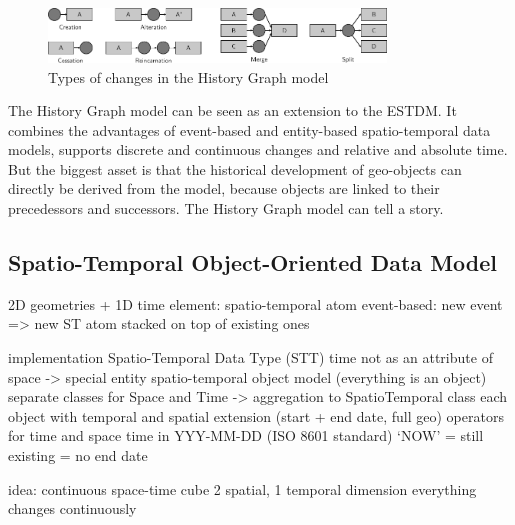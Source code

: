 \begin{figure}[ht]
  \centering
  \includegraphics[width=0.8\textwidth]{graphics/basics/stdm/history_graph_changes}
  \caption{Types of changes in the History Graph model}
  \label{fig:history_graph_changes}
\end{figure}

The History Graph model can be seen as an extension to the ESTDM. It combines the advantages of event-based and entity-based spatio-temporal data models, supports discrete and continuous changes and relative and absolute time. But the biggest asset is that the historical development of geo-objects can directly be derived from the model, because objects are linked to their precedessors and successors. The History Graph model can tell a story.



\subsection{Spatio-Temporal Object-Oriented Data Model} %
\label{sub:spatio_temporal_object_oriented_data_model}

2D geometries + 1D time
element: spatio-temporal atom
event-based: new event => new ST atom stacked on top of existing ones




implementation
  Spatio-Temporal Data Type (STT)
    time not as an attribute of space -> special entity
    spatio-temporal object model (everything is an object)
      separate classes for Space and Time
      -> aggregation to SpatioTemporal class
      each object with temporal and spatial extension (start + end date, full geo)
    operators for time and space
    time in YYY-MM-DD (ISO 8601 standard)
      `NOW' = still existing = no end date
    \cite{raza12}

idea: continuous space-time cube
  2 spatial, 1 temporal dimension
  everything changes continuously

